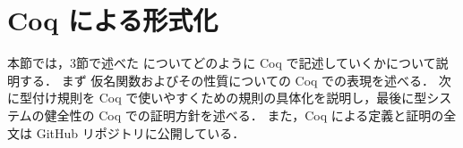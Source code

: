\section{Coq による形式化}

本節では，3節で述べた \api についてどのように Coq で記述していくかについて説明する．
まず%
仮名関数およびその性質についての Coq での表現を述べる．
次に型付け規則を Coq で使いやすくための規則の具体化を説明し，最後に型システムの健全性の Coq での証明方針を述べる．
また，Coq による定義と証明の全文は GitHub リポジトリ\cite[api]{api}に公開している．







